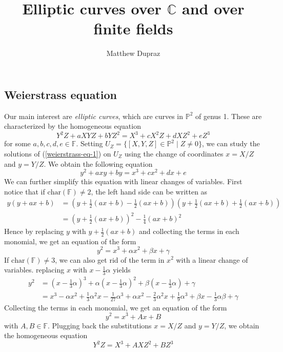 \documentclass{article}
\author{Matthew Dupraz}
\title{Elliptic curves over $\mathbb{C}$ and over finite fields}
\theoremstyle{definition}
\theoremstyle{remark}
\newcommand{\proj}{\mathbb{P}}
\newcommand{\F}{\mathbb{F}}
\newcommand{\chr}{\mathrm{char}}
\begin{document}
\maketitle

\subsection{Weierstrass equation}

Our main interest are \emph{elliptic curves}, which are curves
in $\proj^2$ of genus 1. These are characterized by the
homogeneous equation
\begin{equation}
	\label{weierstrass-eq-1}
	Y^2Z + aXYZ + bYZ^2 = X^3 + cX^2Z + dXZ^2 + eZ^3
\end{equation}
for some $a, b, c, d, e \in \F$.
Setting $U_Z = \{[X, Y, Z] \in \proj^2 \mid Z \neq 0\}$, we can
study the solutions of (\ref{weierstrass-eq-1}) on
$U_Z$ using the change of coordinates $x = X/Z$
and $y = Y/Z$. We obtain the following equation
\begin{equation}
	\label{weierstrass-eq-2}
	y^2 + axy + by = x^3 + cx^2 + dx + e
\end{equation}
We can further simplify this equation with linear
changes of variables. First notice that if $\chr(\F) \neq 2$,
the left hand side can be
written as
\begin{align*}
	y(y + ax + b) &= (y + \frac{1}{2}(ax + b) - \frac{1}{2}(ax + b))
	(y + \frac{1}{2}(ax + b) + \frac{1}{2}(ax + b))\\
	&= (y + \frac{1}{2}(ax + b))^2 - \frac{1}{4}(ax + b)^2
\end{align*}
Hence by replacing $y$ with $y + \frac{1}{2}(ax + b)$ and
collecting the terms in each monomial, we get an equation
of the form
\begin{equation}
	y^2 = x^3 + \alpha x^2 + \beta x + \gamma
\end{equation}
If $\chr(\F) \neq 3$, we can also get rid of the term in 
$x^2$ with a linear change
of variables. replacing $x$ with $x - \frac{1}{3}\alpha$ yields
\begin{align*}
	y^2 &= (x - \frac{1}{3}\alpha)^3 + \alpha(x-\frac{1}{3}\alpha)^2
	+ \beta(x - \frac{1}{3}\alpha) + \gamma\\
	&= x^3 - \alpha x^2 + \frac{1}{3}\alpha^2 x
	- \frac{1}{27}\alpha^3 + \alpha x^2 - \frac{2}{3}\alpha^2 x
	+ \frac{1}{9}\alpha^3 + \beta x - \frac{1}{3}\alpha \beta
	+ \gamma
\end{align*}
Collecting the terms in each monomial, we get an equation of the
form
\begin{equation}
	y^2 = x^3 + Ax + B
\end{equation}
with $A, B \in \F$.
Plugging back the substitutions $x = X/Z$ and $y = Y/Z$, we obtain
the homogeneous equation
\begin{equation}
	Y^2Z = X^3 + AXZ^2 + BZ^3
\end{equation}
\end{document}
